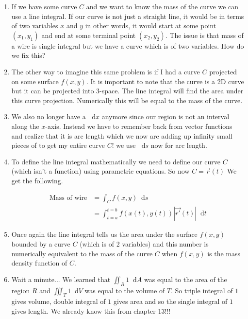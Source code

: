 \documentclass[11pt]{article}
\newcommand*\dif{\mathop{}\!\mathrm{d}}
\begin{document}
\begin{enumerate}
\item If we have some curve $C$ and we want to know the mass of the curve we can use a line integral. If our curve is not just a straight line, it would be in terms of two variables $x$ and $y$ in other words, it would start at some point $(x_1,y_1)$ and end at some terminal point $(x_2,y_2)$. The issue is that mass of a wire is single integral but we have a curve which is of two variables. How do we fix this?

\item The other way to imagine this same problem is if I had a curve $C$ projected on some surface $f(x,y)$. It is important to note that the curve is a 2D curve but it can be projected into 3-space. The line integral will find the area under this curve projection. Numerically this will be equal to the mass of the curve.

\item We also no longer have a $\dif{x}$ anymore since our region is not an interval along the $x$-axis. Instead we have to remember back from vector functions and realize that it is arc length which we now are adding up infinity small pieces of to get my entire curve $C$! we use $\dif{s}$ now for arc length.

\item To define the line integral mathematically we need to define our curve $C$ (which isn't a function) using parametric equations. So now $C = \vec{r}(t)$  We get the following.

\begin{align*}
   \text{Mass of wire} &= \int_C f(x,y) \dif{s}\\
   &= \int_{t=a}^{t=b} f\left(x(t),y(t)\right) \left|\vec{r'}(t)\right| \dif{t} 
\end{align*}

\item Once again the line integral tells us the area under the surface $f(x,y)$ bounded by a curve $C$ (which is of 2 variables) and this number is numerically equivalent to the mass of the curve $C$ when $f(x,y)$ is the mass density function of $C$. 

\item Wait a minute... We learned that $\iint_R 1 \dif{A}$ was equal to the area of the region $R$ and $\iiint_T 1 \dif{V}$ was equal to the volume of $T$. So triple integral of $1$ gives volume, double integral of $1$ gives area and so the single integral of $1$ gives length. We already know this from chapter 13!!!


\end{enumerate}
\end{document}
